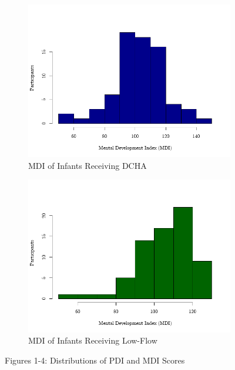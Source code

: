 \documentclass{article}
\begin{document}
\begin{enumerate}
\begin{figure}[h!]
\begin{subfigure}[b]{0.23\textwidth}
				\centering
				\includegraphics[width=\textwidth]{CS2_DCHA_mdi.png}
				\caption{MDI of Infants Receiving DCHA}
			\end{subfigure}
			\hfill
			\begin{subfigure}[b]{0.23\textwidth}  %
				\centering
				\includegraphics[width=\textwidth]{CS2_LF_mdi.png}
				\caption{MDI of Infants Receiving Low-Flow}
			\end{subfigure}
			\caption{Figures 1-4: Distributions of PDI and MDI Scores}
			\label{fig:four_images}
		\end{figure}

		\newpage


\end{enumerate}
\end{document}
